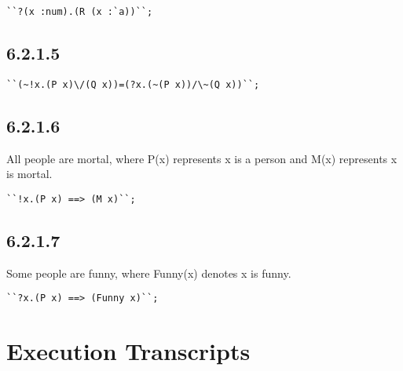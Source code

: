 \documentclass{report}
\begin{document}
\lstset{frameround=tttt}
\begin{lstlisting}[frame=tRBL]
``?(x :num).(R (x :`a))``;
\end{lstlisting}

\subsection{6.2.1.5}
\label{sec:6.2.1.5}

\lstset{frameround=tttt}
\begin{lstlisting}[frame=tRBL]
``(~!x.(P x)\/(Q x))=(?x.(~(P x))/\~(Q x))``;
\end{lstlisting}

\subsection{6.2.1.6}
\label{sec:6.2.1.6}

All people are mortal, where P(x) represents x is a person and M(x) represents x is mortal.

\lstset{frameround=tttt}
\begin{lstlisting}[frame=tRBL]
``!x.(P x) ==> (M x)``;
\end{lstlisting}

\subsection{6.2.1.7}
\label{sec:6.2.1.7}

Some people are funny, where Funny(x) denotes x is funny.

\lstset{frameround=tttt}
\begin{lstlisting}[frame=tRBL]
``?x.(P x) ==> (Funny x)``;
\end{lstlisting}


\section{Execution Transcripts}
\label{sec:exec-transcr-5}
\end{document}
